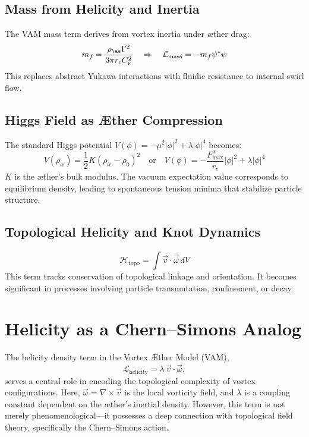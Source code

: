 \subsection{Mass from Helicity and Inertia}
The VAM mass term derives from vortex inertia under æther drag:
\begin{equation}
    m_f = \frac{\rho_{\ae} \Gamma^2}{3\pi r_c C_e^2} \quad\Rightarrow\quad \mathcal{L}_{\text{mass}} = -m_f \psi^* \psi
\end{equation}
This replaces abstract Yukawa interactions with fluidic resistance to internal swirl flow.

\subsection{Higgs Field as Æther Compression}
The standard Higgs potential $V(\phi) = -\mu^2|\phi|^2 + \lambda|\phi|^4$ becomes:
\begin{equation}
    V(\rho_\text{\ae}) = \frac{1}{2}K(\rho_\text{\ae} - \rho_0)^2 \quad\text{or}\quad V(\phi) = -\frac{F^{\text{\ae}}_{\text{max}}}{r_c} |\phi|^2 + \lambda |\phi|^4
\end{equation}
$K$ is the æther’s bulk modulus. The vacuum expectation value corresponds to equilibrium density, leading to spontaneous tension minima that stabilize particle structure.

\subsection{Topological Helicity and Knot Dynamics}
\begin{equation}
    \mathcal{H}_\text{topo} = \int \vec{v} \cdot \vec{\omega} \, dV
\end{equation}
This term tracks conservation of topological linkage and orientation. It becomes significant in processes involving particle transmutation, confinement, or decay.

\section{Helicity as a Chern--Simons Analog}

The helicity density term in the Vortex Æther Model (VAM),
\begin{equation}
\mathcal{L}_{\text{helicity}} = \lambda\, \vec{v} \cdot \vec{\omega},
\end{equation}
serves a central role in encoding the topological complexity of vortex configurations. Here, $\vec{\omega} = \nabla \times \vec{v}$ is the local vorticity field, and $\lambda$ is a coupling constant dependent on the æther's inertial density. However, this term is not merely phenomenological—it possesses a deep connection with topological field theory, specifically the Chern--Simons action.

